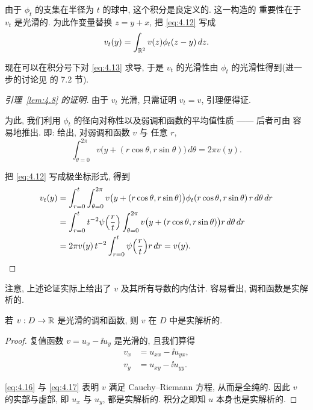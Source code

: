 由于 $\phi_t$ 的支集在半径为 $t$ 的球中, 这个积分是良定义的. 这一构造的
重要性在于 $v_t$ 是光滑的. 为此作变量替换 $z=y+x$, 把 \eqref{eq:4.12}
写成
\begin{equation}
v_t(y)=\int_{\mathbb{R}^2}v(z)\phi_t(z-y)\,dz.
\label{eq:4.13}
\end{equation}

现在可以在积分号下对 \eqref{eq:4.13} 求导, 于是 $v_t$ 的光滑性由
$\phi_t$ 的光滑性得到(进一步的讨论见 \cite{GiTr} 的 7.2 节).

\begin{proof}[引理~\ref{lem:4.8} 的证明]
由于 $v_t$ 光滑, 只需证明 $v_t=v$, 引理便得证.

为此, 我们利用 $\phi_t$ 的径向对称性以及弱调和函数的平均值性质 ——
后者可由 容易地推出. 即:  给出, 对弱调和函数 $v$ 与
任意 $r$,
\begin{equation}
\int_{\theta=0}^{2\pi}v\bigl(y+(r\cos\theta,r\sin\theta)\bigr)\,d\theta
 =2\pi v(y).
\label{eq:4.14}
\end{equation}

把 \eqref{eq:4.12} 写成极坐标形式, 得到
\begin{equation}
\begin{aligned}
v_t(y)&=\int_{r=0}^{t}\int_{\theta=0}^{2\pi}
 v\bigl(y+(r\cos\theta,r\sin\theta)\bigr)
 \phi_t(r\cos\theta,r\sin\theta)\,r\,d\theta\,dr\\
&=\int_{r=0}^{t}t^{-2}\psi\Bigl(\frac rt\Bigr)
 \int_{\theta=0}^{2\pi}v\bigl(y+(r\cos\theta,r\sin\theta)\bigr)
 r\,d\theta\,dr\\
&=2\pi v(y)\,t^{-2}\int_{r=0}^{t}\psi\Bigl(\frac rt\Bigr)r\,dr=v(y).
\end{aligned}
\label{eq:4.15}
\end{equation}
\end{proof}

注意, 上述论证实际上给出了 $v$ 及其所有导数的内估计. 容易看出,
调和函数是实解析的.

\begin{corollary}
\label{cor:4.9}
若 $v:D\to\mathbb{R}$ 是光滑的调和函数, 则 $v$ 在 $D$ 中是实解析的.
\end{corollary}

\begin{proof}
复值函数 $v=u_x-\ii u_y$ 是光滑的, 且我们算得
\begin{align}
v_x&=u_{xx}-\ii u_{yx},\label{eq:4.16}\\
v_y&=u_{xy}-\ii u_{yy}.\label{eq:4.17}
\end{align}

\eqref{eq:4.16} 与 \eqref{eq:4.17} 表明 $v$ 满足 Cauchy--Riemann 方程,
从而是全纯的. 因此 $v$ 的实部与虚部, 即 $u_x$ 与 $u_y$, 都是实解析的.
积分之即知 $u$ 本身也是实解析的.
\end{proof}

